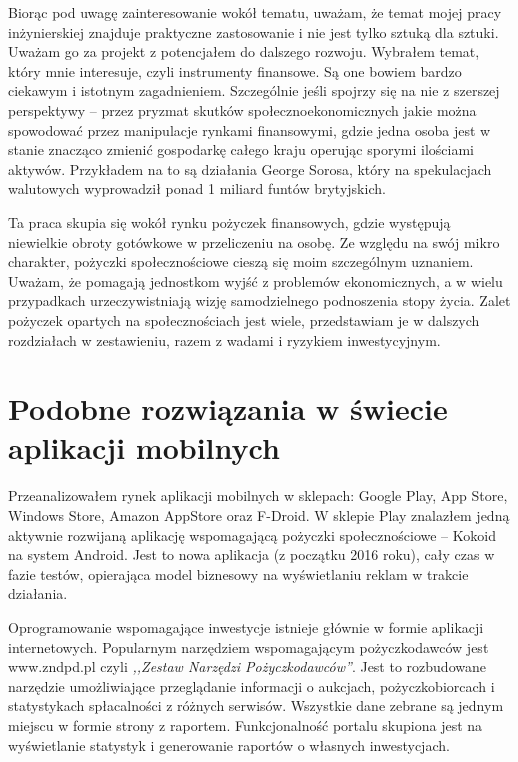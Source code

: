 \documentclass[a4paper,twoside,titlepage,openright]{book}
\begin{document}
Biorąc pod uwagę zainteresowanie wokół tematu, uważam, że temat mojej pracy inżynierskiej znajduje praktyczne zastosowanie i nie jest tylko sztuką dla sztuki. Uważam go za projekt z potencjałem do dalszego rozwoju. Wybrałem temat, który mnie interesuje, czyli instrumenty finansowe. Są one bowiem bardzo ciekawym i istotnym zagadnieniem. Szczególnie jeśli spojrzy się na nie z szerszej perspektywy -- przez pryzmat skutków społecznoekonomicznych jakie można spowodować przez manipulacje rynkami finansowymi, gdzie jedna osoba jest w stanie znacząco zmienić gospodarkę całego kraju operując sporymi ilościami aktywów. Przykładem na to są działania George Sorosa, który na spekulacjach walutowych wyprowadził ponad 1 miliard funtów brytyjskich.\cite{soros}

Ta praca skupia się wokół rynku pożyczek finansowych, gdzie występują niewielkie obroty gotówkowe w przeliczeniu na osobę. Ze względu na swój mikro charakter, pożyczki społecznościowe cieszą się moim szczególnym uznaniem. Uważam, że pomagają jednostkom wyjść z problemów ekonomicznych, a w wielu przypadkach urzeczywistniają wizję samodzielnego podnoszenia stopy życia. Zalet pożyczek opartych na społecznościach jest wiele, przedstawiam je w dalszych rozdziałach w zestawieniu, razem z wadami i ryzykiem inwestycyjnym.

\section*{Podobne rozwiązania w świecie aplikacji mobilnych}

Przeanalizowałem rynek aplikacji mobilnych w sklepach: Google Play, App Store, Windows Store, Amazon AppStore oraz F-Droid. W sklepie Play znalazłem jedną aktywnie rozwijaną aplikację wspomagającą pożyczki społecznościowe -- Kokoid na system Android. Jest to nowa aplikacja (z początku 2016 roku), cały czas w fazie testów, opierająca model biznesowy na wyświetlaniu reklam w trakcie działania.

Oprogramowanie wspomagające inwestycje istnieje głównie w formie aplikacji internetowych. Popularnym narzędziem wspomagającym pożyczkodawców jest www.zndpd.pl czyli \textit{,,Zestaw Narzędzi Pożyczkodawców''}. Jest to rozbudowane narzędzie umożliwiające przeglądanie informacji o aukcjach, pożyczkobiorcach i statystykach spłacalności z różnych serwisów. Wszystkie dane zebrane są jednym miejscu w formie strony z raportem. Funkcjonalność portalu skupiona jest na wyświetlanie statystyk i generowanie raportów o własnych inwestycjach. 
\end{document}
